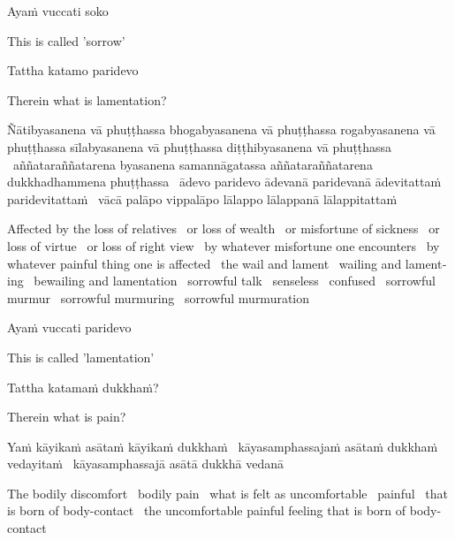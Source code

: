 Ayaṁ vuccati soko

\begin{english}
  This is called 'sorrow'
\end{english}

Tattha katamo paridevo

\begin{english}
  Therein what is lamentation?
\end{english}

Ñātibyasanena vā phuṭṭhassa bhogabyasanena vā phuṭṭhassa rogabyasanena vā phuṭṭhassa sīlabyasanena vā phuṭṭhassa diṭṭhibyasanena vā phuṭṭhassa \breathmark\ aññataraññatarena byasanena samannāgatassa aññataraññatarena dukkhadhammena phuṭṭhassa \breathmark\ ādevo paridevo ādevanā paridevanā ādevitattaṁ paridevitattaṁ \breathmark\ vācā palāpo vippalāpo lālappo lālappanā lālappitattaṁ

\begin{english}
  Affected by the loss of relatives \breathmark\ or loss of wealth \breathmark\ or misfortune of sickness \breathmark\ or loss of virtue \breathmark\ or loss of right view \breathmark\ by whatever misfortune one encounters \breathmark\ by whatever painful thing one is affected \breathmark\ the wail and lament \breathmark\ wailing and lamenting \breathmark\ bewailing and lamentation \breathmark\ sorrowful talk \breathmark\ senseless \breathmark\ confused \breathmark\ sorrowful murmur \breathmark\ sorrowful murmuring \breathmark\ sorrowful murmuration
\end{english}

Ayaṁ vuccati paridevo

\begin{english}
  This is called 'lamentation'
\end{english}

Tattha katamaṁ dukkhaṁ?

\begin{english}
  Therein what is pain?
\end{english}

Yaṁ kāyikaṁ asātaṁ kāyikaṁ dukkhaṁ \breathmark\ kāyasamphassajaṁ asātaṁ dukkhaṁ vedayitaṁ \breathmark\ kāyasamphassajā asātā dukkhā vedanā

\begin{english}
  The bodily discomfort \breathmark\ bodily pain \breathmark\ what is felt as uncomfortable \breathmark\ painful \breathmark\ that is born of body-contact \breathmark\ the uncomfortable painful feeling that is born of body-contact
\end{english}

